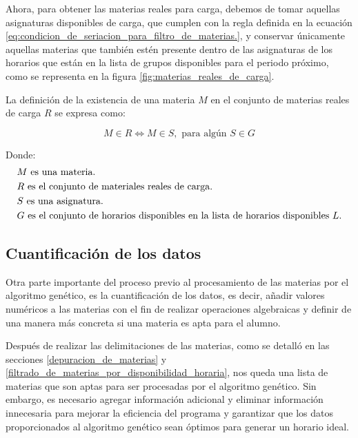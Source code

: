 Ahora, para obtener las materias reales para carga, debemos de tomar aquellas asignaturas disponibles de carga, que cumplen con la regla definida en la ecuación \ref{eq:condicion_de_seriacion_para_filtro_de_materias.}, y conservar únicamente aquellas materias que también estén presente dentro de las asignaturas de los horarios que están en la lista de grupos disponibles para el periodo próximo, como se representa en la figura \ref{fig:materias_reales_de_carga}.

La definición de la existencia de una materia \( M \) en el conjunto de materias reales de carga \( R \) se expresa como:

\begin{equation}
    M \in R \iff M \in S, \text{ para algún } S \in G
    \label{eq:definicion_materiales_reales_de_carga}
\end{equation} 

Donde:
\begin{align*}
    & M \text{ es una materia.} \\
    & R \text{ es el conjunto de materiales reales de carga.} \\
    & S \text{ es una asignatura.} \\
    & G \text{ es el conjunto de horarios disponibles en la lista de horarios disponibles \( L \).}
\end{align*}

\subsection{Cuantificación de los datos} \label{cuantifiacion_de_datos}

Otra parte importante del proceso previo al procesamiento de las materias por el algoritmo genético, es la cuantificación de los datos, es decir, añadir valores numéricos a las materias con el fin de realizar operaciones algebraicas y definir de una manera más concreta si una materia es apta para el alumno.

Después de realizar las delimitaciones de las materias, como se detalló en las secciones \ref{depuracion_de_materias} y \ref{filtrado_de_materias_por_disponibilidad_horaria}, nos queda una lista de materias que son aptas para ser procesadas por el algoritmo genético. Sin embargo, es necesario agregar información adicional y eliminar información innecesaria para mejorar la eficiencia del programa y garantizar que los datos proporcionados al algoritmo genético sean óptimos para generar un horario ideal.

